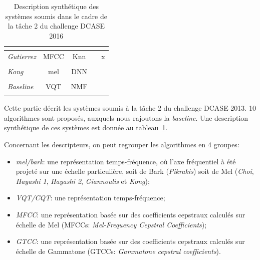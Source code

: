 \begin{table}[t]
\begin{center}
\begin{tabular}{lcccc}
\citep{Vu2016}               &                              &                      &           & \\ 
\hline
\emph{Gutierrez}             &     MFCC                     & Knn                  &           & x \\ 
\citep{GutierrezArriola2016} &                              &                      &           & \\ 
\hline
\emph{Kong}                  &     mel                      & DNN                  &           &  \\ 
\citep{Kong2016}             &                              &                      &           & \\ 
\hline  
\emph{Baseline}              &     VQT                      & NMF                  &           & \\ 
\citep{Benetos2016}          &                              &                      &           & \\ 
\hline 
\end{tabular}
\end{center}
\caption{Description synthétique des systèmes soumis dans le cadre de la tâche 2 du challenge DCASE 2016}
\label{tab:systemsDcase2016}
\end{table}

Cette partie décrit les systèmes soumis à la tâche 2 du challenge DCASE 2013. 10 algorithmes sont proposés, auxquels nous rajoutons la \emph{baseline}. Une description synthétique de ces systèmes est donnée au tableau~\ref{tab:systemsDcase2016}. 

Concernant les descripteurs, on peut regrouper les algorithmes en 4 groupes:

\begin{itemize}
\item \emph{mel/bark}: une représentation temps-fréquence, où l'axe fréquentiel à été projeté sur une échelle particulière, soit de Bark (\emph{Pikrakis}) soit de Mel (\emph{Choi}, \emph{Hayashi 1}, \emph{Hayashi 2}, \emph{Giannoulis} et \emph{Kong});
\item \emph{VQT/CQT}: une représentation temps-fréquence; %
\item \emph{MFCC}: une représentation basée sur des coefficients cepstraux calculés sur échelle de Mel (MFCCs: \emph{Mel-Frequency Cepstral Coefficients});
\item \emph{GTCC}: une représentation basée sur des coefficients cepstraux calculés sur échelle de Gammatone (GTCCs: \emph{Gammatone cepstral coefficients}).
\end{itemize}

